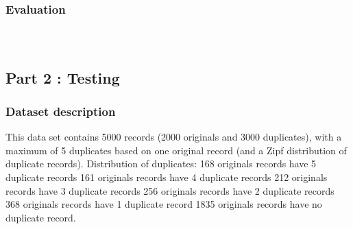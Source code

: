 \documentclass{article}
\begin{document}
    \begin{Verbatim}[commandchars=\\\{\}]

\end{Verbatim}

    \begin{Verbatim}[commandchars=\\\{\}]

\end{Verbatim}

    \hypertarget{evaluation}{%
\subsubsection{Evaluation}\label{evaluation}}

    \begin{Verbatim}[commandchars=\\\{\}]

\end{Verbatim}

    \begin{Verbatim}[commandchars=\\\{\}]

\end{Verbatim}

    \begin{Verbatim}[commandchars=\\\{\}]

\end{Verbatim}

    \hypertarget{part-2-testing}{%
\subsection{Part 2 : Testing}\label{part-2-testing}}

\hypertarget{dataset-description}{%
\subsubsection{Dataset description}\label{dataset-description}}

This data set contains 5000 records (2000 originals and 3000
duplicates), with a maximum of 5 duplicates based on one original record
(and a Zipf distribution of duplicate records). Distribution of
duplicates: 168 originals records have 5 duplicate records 161 originals
records have 4 duplicate records 212 originals records have 3 duplicate
records 256 originals records have 2 duplicate records 368 originals
records have 1 duplicate record 1835 originals records have no duplicate
record.
\end{document}
